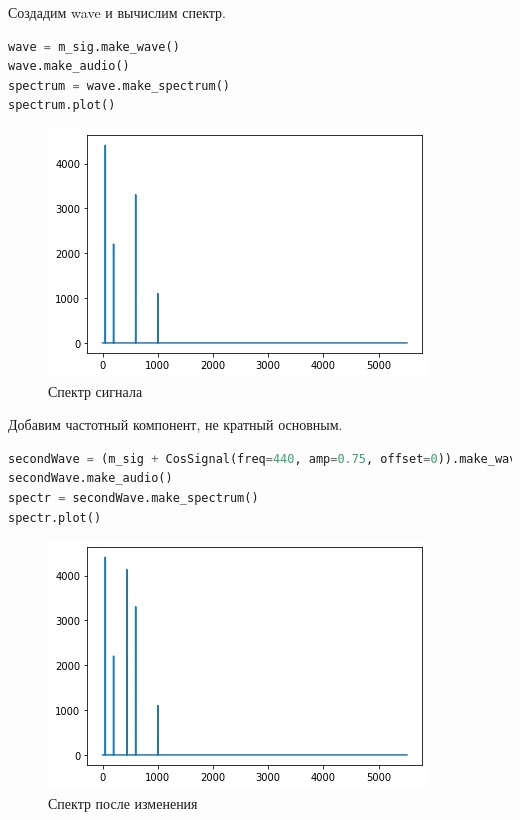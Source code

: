 Создадим wave и вычислим спектр.

\begin{lstlisting}[language=Python]
wave = m_sig.make_wave()
wave.make_audio()
spectrum = wave.make_spectrum()
spectrum.plot()
\end{lstlisting}

\begin{figure}[H]
	\begin{center}
		\includegraphics[scale=1]{fig/lab01/lab01_7.png}
		\caption{Спектр сигнала}
	\end{center}
\end{figure}

Добавим частотный компонент, не кратный основным.

\begin{lstlisting}[language=Python]
secondWave = (m_sig + CosSignal(freq=440, amp=0.75, offset=0)).make_wave()
secondWave.make_audio()
spectr = secondWave.make_spectrum()
spectr.plot()
\end{lstlisting}

\begin{figure}[H]
	\begin{center}
		\includegraphics[scale=1]{fig/lab01/lab01_8.png}
		\caption{Спектр после изменения}
	\end{center}
\end{figure}

